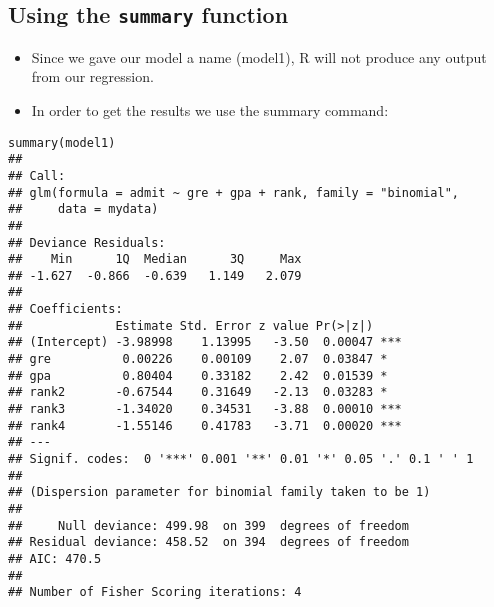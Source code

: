 \documentclass[]{article}
\begin{document}
\subsection{Using the \texttt{summary} function}
\begin{itemize}
\item Since we gave our model a name (model1), R will not produce any output from our regression. 
\item In order to get the results we use the summary command:
\end{itemize}
\begin{framed}
\begin{verbatim}
summary(model1)
## 
## Call:
## glm(formula = admit ~ gre + gpa + rank, family = "binomial", 
##     data = mydata)
## 
## Deviance Residuals: 
##    Min      1Q  Median      3Q     Max  
## -1.627  -0.866  -0.639   1.149   2.079  
## 
## Coefficients:
##             Estimate Std. Error z value Pr(>|z|)    
## (Intercept) -3.98998    1.13995   -3.50  0.00047 ***
## gre          0.00226    0.00109    2.07  0.03847 *  
## gpa          0.80404    0.33182    2.42  0.01539 *  
## rank2       -0.67544    0.31649   -2.13  0.03283 *  
## rank3       -1.34020    0.34531   -3.88  0.00010 ***
## rank4       -1.55146    0.41783   -3.71  0.00020 ***
## ---
## Signif. codes:  0 '***' 0.001 '**' 0.01 '*' 0.05 '.' 0.1 ' ' 1
## 
## (Dispersion parameter for binomial family taken to be 1)
## 
##     Null deviance: 499.98  on 399  degrees of freedom
## Residual deviance: 458.52  on 394  degrees of freedom
## AIC: 470.5
## 
## Number of Fisher Scoring iterations: 4
\end{verbatim}
\end{framed}
\end{document}
